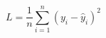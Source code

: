 \documentclass{article}
\begin{document}
\begin{equation}

L = \frac{1}{n} \sum_{i=1}^{n} (y_i - \hat{y}_i)^2

\end{equation}
\end{document}
